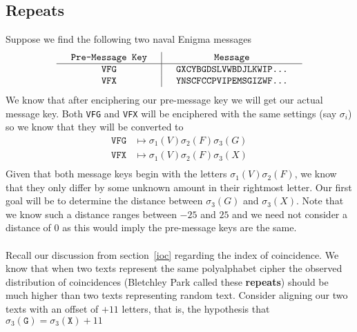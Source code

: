 \subsection{Repeats}
Suppose we find the following two naval Enigma messages
\[
	\setlength{\arraycolsep}{15pt}
	\begin{array}{c | c}
		\texttt{Pre-Message Key} & \texttt{Message}                \\
		\hline
		\texttt{VFG}             & \texttt{GXCYBGDSLVWBDJLKWIP...} \\
		\texttt{VFX}             & \texttt{YNSCFCCPVIPEMSGIZWF...} \\
	\end{array}
\]
We know that after enciphering our pre-message key we will get our
actual message key. Both \texttt{VFG} and \texttt{VFX} will be
enciphered with the same settings (say $\sigma_i$) so we know that
they will be converted to
\begin{align*}
	\texttt{VFG} & \mapsto \sigma_1(V)\sigma_2(F)\sigma_3(G) \\
	\texttt{VFX} & \mapsto \sigma_1(V)\sigma_2(F)\sigma_3(X) \\
\end{align*}
Given that both message keys begin with the letters
$\sigma_1(V)\sigma_2(F)$, we know that they only differ by some
unknown amount in their rightmost letter. Our first goal will be to
determine the distance between $\sigma_3(G)$ and $\sigma_3(X)$.
Note that we know such a distance ranges between $-25$ and $25$ and
we need not consider a distance of $0$ as this would imply the
pre-message keys are the same.
\\\\Recall our discussion from section~\ref{ioc} regarding the
index of coincidence. We know that when two texts represent the
same polyalphabet cipher the observed distribution of coincidences
(Bletchley Park called these {\bf{repeats}}) should be much higher
than two texts representing random text. Consider aligning our two
texts with an offset of $+11$ letters, that is, the hypothesis that
$\sigma_3(\texttt{G}) = \sigma_3(\texttt{X}) + 11$
\begin{center}
\end{center}
